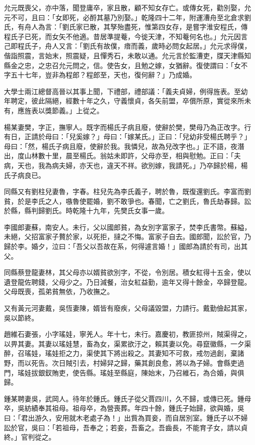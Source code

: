 \begin{pinyinscope}
允元既喪父，亦中落，聞登庸卒，家且散，顧不知女存亡。或傳女死，勸別娶，允元不可，且曰：「女即死，必酹其墓乃別娶。」乾隆四十二年，附運漕舟至北倉求劉氏，有舟人為言：「劉氏家已散，其孥殆盡死，惟第四女存，是嘗字淮安程氏，傳程氏子已死，而女矢不他適。昔居準提菴，今徙天津，不知菴何名也。」允元因言己即程氏子，舟人又言：「劉氏有故僕，瘖而義，歲時必問女起居。」允元求得僕，偕詣照震，言始末，照震疑，且憚秀石，未敢以通。允元言於監漕吏，牒天津縣知縣金之忠，之忠召允元問之，信。使告女，且勉之嫁，女猶辭。復使謂曰：「女不字五十七年，豈非為程郎？程郎至，天也，復何辭？」乃成婚。

大學士兩江總督高晉以其事上聞，下禮部，禮部議：「義夫貞婦，例得旌表。至幼年聘定，彼此隔絕，經數十年之久，守義懷貞，各矢前盟，卒償所原，實從來所未有，應旌表以獎節義。」上從之。

楊某妻樊，字正，撫寧人。既字而楊氏子病且廢，使辭於樊，樊母乃為正改字。行有日，正請於母曰：「兒奚嫁？」母曰：「嫁某氏。」正曰：「兒幼非受楊氏聘乎？」母曰：「然，楊氏子病且廢，使辭於我。我憐兒，故為兒改字也。」正不語，夜潛出，度山林數十里，晨至楊氏。翁姑未即許，父母亦至，相與慰勉。正曰：「夫病，天也，我為病夫婦，亦天也，違天不祥。欲別嫁，我請死。」乃卒歸於楊，楊氏子病良已。

同縣又有劉柱兒妻魯，字春。柱兒先為李氏義子，聘於魯，既復還劉氏。李富而劉貧，於是李氏之人，嗾魯使罷婚，劉不敢爭也。春聞，亡之劉氏，魯氏劫春歸。訟於縣，縣判歸劉氏。時乾隆十九年，先樊氏女事一歲。

李國郎妻蘇，南安人。未行，父以國郎貧，為女別字富家子，焚李氏書幣。蘇縊，未絕，父招富家子贅於家，以死拒，撻之不悔。富家子自去。國郎聞，訟於官，乃歸於李。婚夕，泣曰：「吾父以吾故在系，何得遽言婚！」國郎為請於有司，出其父。

同縣蔡登龍妻林，其父母亦以婿貧欲別字，不從，令別居。積女紅得十五金，使以遺登龍佐聘錢，父母少之。乃日減餐，治女紅益勤，逾年又得十餘金，卒歸登龍。父母既喪，孤弟貧無依，乃收撫之。

又有黃元河妻戴，吳恆妻陳，婿皆有廢疾，父母議毀盟，力請行。戴勤儉起其家，吳以節終。

趙維石妻張，小字瑤娃，寧羌人。年十七，未行。嘉慶初，教匪掠州，賊渠得之，以畀其妻。其妻以瑤娃慧，畜為女，渠累欲汙之，賴其妻以免。尋竄徽縣，一夕渠醉，召瑤娃，瑤娃拒之力，渠使其下將出殺之。其妻知不可救，戒勿過創，棄諸野，而以死告。次日賊引去，村婦舁之歸，藥其創良愈，將以為子婦。會縣吏過門，瑤娃拔銀釵賄吏，使告縣。瑤娃至縣庭，陳始末，乃召維石，為合婚，與俱歸。

鍾某聘妻吳，武岡人。待年於鍾氏。鍾氏子從父賈四川，久不歸，或傳已死。鍾母卒，吳紡績奉其祖母。祖母卒，為營喪葬。年四十餘，鍾氏子始歸，欲與婚，吳曰：「君出游久，安用就木老處子為！」出貲為買妾，而自居別室。鍾氏子以不婦訟於官，吳曰：「若祖母，吾奉之；若妾，吾畜之。吾齒長，不能育子女，請以貞終。」官判從之。


\end{pinyinscope}
